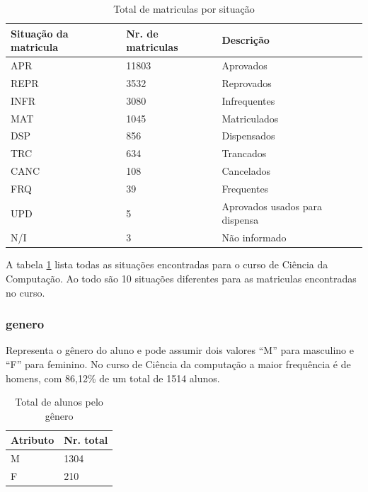 \documentclass[diss,capa]{texufpel}
\begin{document}
\begin{table}[htbp]
\begin{center}
\caption{Total de matriculas por situação}
\label{tab:disciplina-situacao}
\begin{tabular}{p{4.5cm}|p{3.5cm}|p{6.5cm}} \hline
Situação da matricula & Nr. de matriculas & Descrição \\ \hline
APR  & 11803 & Aprovados \\
REPR &  3532 & Reprovados \\
INFR &  3080 & Infrequentes \\
MAT  &  1045 & Matriculados \\
DSP  &   856 & Dispensados \\
TRC  &   634 & Trancados \\
CANC &   108 & Cancelados \\
FRQ  &    39 & Frequentes \\
UPD  &     5 & Aprovados usados para dispensa \\
N/I  &     3 & Não informado \\ \hline
\end{tabular}
\end{center}
\end{table}

A tabela \ref{tab:disciplina-situacao} lista todas as situações encontradas para o curso de Ciência da Computação.
Ao todo são 10 situações diferentes para as matriculas encontradas no curso.

\subsubsection{genero}

Representa o gênero do aluno e pode assumir dois valores ``M'' para masculino e ``F'' para feminino.
No curso de Ciência da computação a maior frequência é de homens, com 86,12\% de um total de 1514 alunos.

\begin{table}[htbp]
\begin{center}
\caption{Total de alunos pelo gênero}
\label{tab:total-aluno-genero}
\begin{tabular}{p{7.5cm}|p{7cm}} \hline
Atributo & Nr. total \\ \hline
M  & 1304 \\
F  &  210 \\ \hline
\end{tabular}
\end{center}
\end{table}
\end{document}

